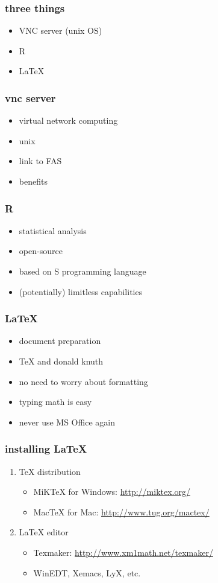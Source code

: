\documentclass[]{beamer}
\begin{document}
\begin{frame}
\frametitle{three things}
\pause
\begin{itemize}
\item VNC server (unix OS)
\item R
\item \LaTeX
\end{itemize}
\end{frame}

\begin{frame}
\frametitle{vnc server}
\pause
\begin{itemize}
\item virtual network computing
\pause
\item unix
\pause
\item link to FAS
\pause
\item benefits
\end{itemize}
\end{frame}

\begin{frame}
\frametitle{R}
\pause
\begin{itemize}
\item statistical analysis
\pause
\item open-source 
\pause
\item based on S programming language
\pause
\item (potentially) limitless capabilities
\end{itemize}
\end{frame}

\begin{frame}
\frametitle{\LaTeX}
\pause
\begin{itemize}
\item document preparation
\pause
\item TeX and donald knuth
\pause
\item no need to worry about formatting
\pause
\item typing math is easy
\pause
\item never use MS Office again
\end{itemize}
\end{frame}

\begin{frame}
\frametitle{installing \LaTeX}
\pause
\begin{enumerate}
\item TeX distribution
\pause
\begin{itemize}
\item MiKTeX for Windows: \url{http://miktex.org/}
\item MacTeX for Mac: \url{http://www.tug.org/mactex/}
\end{itemize}
\pause
\bigskip
\item \LaTeX\hspace{1pt} editor
\pause
\begin{itemize}
\item Texmaker: \url{http://www.xm1math.net/texmaker/}
\item WinEDT, Xemacs, LyX, etc.
\end{itemize}
\end{enumerate}
\end{frame}
\end{document}
